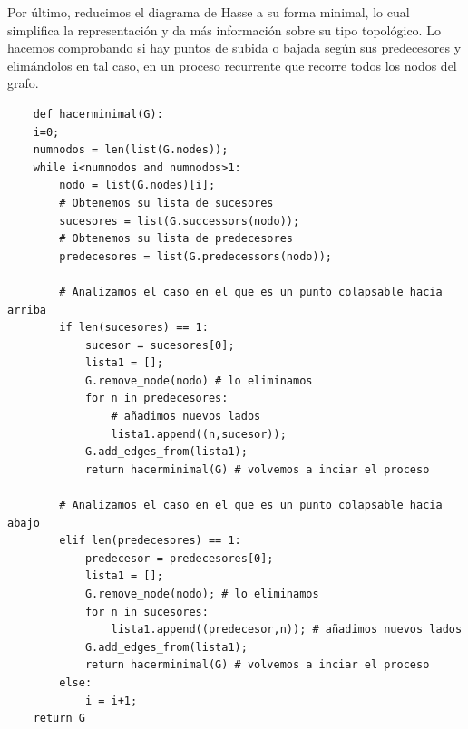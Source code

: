 Por último, reducimos el diagrama de Hasse a su forma minimal, lo cual simplifica la representación y da más información sobre su tipo topológico. Lo hacemos comprobando si hay puntos de subida o bajada según sus predecesores y elimándolos en tal caso, en un proceso recurrente que recorre todos los nodos del grafo.

\begin{verbatim}
    def hacerminimal(G):
    i=0;
    numnodos = len(list(G.nodes));
    while i<numnodos and numnodos>1:
        nodo = list(G.nodes)[i];
        # Obtenemos su lista de sucesores
        sucesores = list(G.successors(nodo));
        # Obtenemos su lista de predecesores
        predecesores = list(G.predecessors(nodo));

        # Analizamos el caso en el que es un punto colapsable hacia arriba
        if len(sucesores) == 1:
            sucesor = sucesores[0];
            lista1 = [];
            G.remove_node(nodo) # lo eliminamos
            for n in predecesores:
                # añadimos nuevos lados 
                lista1.append((n,sucesor)); 
            G.add_edges_from(lista1);
            return hacerminimal(G) # volvemos a inciar el proceso

        # Analizamos el caso en el que es un punto colapsable hacia abajo
        elif len(predecesores) == 1:
            predecesor = predecesores[0];
            lista1 = [];
            G.remove_node(nodo); # lo eliminamos
            for n in sucesores:
                lista1.append((predecesor,n)); # añadimos nuevos lados 
            G.add_edges_from(lista1);
            return hacerminimal(G) # volvemos a inciar el proceso 
        else:
            i = i+1;
    return G
\end{verbatim}

